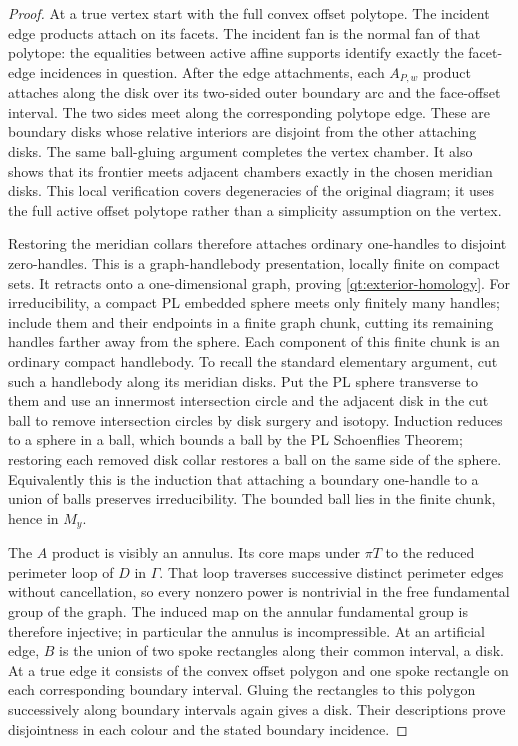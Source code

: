 \documentclass[11pt]{article}
\numberwithin{equation}{section}
\theoremstyle{definition}
\theoremstyle{remark}
\begin{document}
\begin{proof}
At a true vertex start with the full convex offset polytope.  The
incident edge products attach on its facets.  The incident fan is the
normal fan of that polytope: the equalities between active affine
supports identify exactly the facet-edge incidences in question.
After the edge attachments, each $A_{P,w}$ product attaches along the
disk over its two-sided outer boundary arc and the face-offset
interval.  The two sides meet along the corresponding polytope edge.
These are boundary disks whose relative interiors are disjoint from
the other attaching disks.  The same ball-gluing argument completes
the vertex chamber.  It also shows that its frontier meets adjacent
chambers exactly in the chosen meridian disks.  This local verification
covers degeneracies of the original diagram; it uses the full active
offset polytope rather than a simplicity assumption on the vertex.

Restoring the meridian collars therefore attaches ordinary
one-handles to disjoint zero-handles.  This is a graph-handlebody
presentation, locally finite on compact sets.  It retracts onto a
one-dimensional graph, proving \eqref{qt:exterior-homology}.
For irreducibility, a compact PL embedded sphere meets only finitely many handles;
include them and their endpoints in a finite graph chunk, cutting its
remaining handles farther away from the sphere.  Each component of
this finite chunk is an ordinary compact handlebody.  To recall the
standard elementary argument, cut such a handlebody along its
meridian disks.  Put the PL sphere transverse to them and use an innermost
intersection circle and the adjacent disk in the cut ball to remove
intersection circles by disk surgery and isotopy.  Induction reduces
to a sphere in a ball, which bounds a ball by the PL Schoenflies
Theorem; restoring each removed disk collar restores a ball on the
same side of the sphere.  Equivalently this is the induction that
attaching a boundary one-handle to a union of balls preserves
irreducibility.  The bounded ball lies in the finite chunk, hence in
$M_y$.

The $A$ product is visibly an annulus.  Its core maps under $\pi T$
to the reduced perimeter loop of $D$ in $\Gamma$.  That loop traverses
successive distinct perimeter edges without cancellation, so every
nonzero power is nontrivial in the free fundamental group of the
graph.  The induced map on the annular fundamental group is therefore
injective; in particular the annulus is incompressible.
At an artificial edge, $B$ is the union of two spoke rectangles along
their common interval, a disk.  At a true edge it consists of the
convex offset polygon and one spoke rectangle on each corresponding
boundary interval.  Gluing the rectangles to this polygon successively
along boundary intervals again gives a disk.  Their descriptions
prove disjointness in each colour and the stated boundary incidence.


\end{proof}
\end{document}
